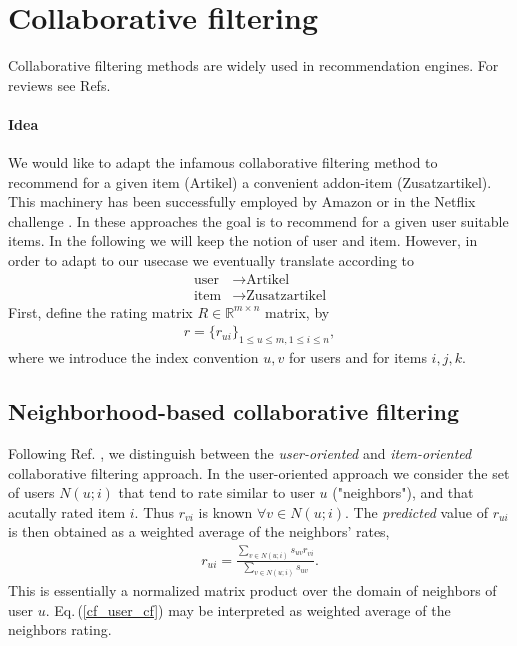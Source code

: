 \documentclass[10pt,a4paper]{article}
\begin{document}
\section{Collaborative filtering}
Collaborative filtering methods are widely used in recommendation engines. For reviews see Refs.\cite{Su:2009:SCF, Adomavicius:2005:TNG, Hofmann:2004:LSM}
\paragraph{Idea} We would like to adapt the infamous collaborative filtering  method to recommend for a given item (Artikel) a convenient addon-item (Zusatzartikel). This machinery has been successfully employed by Amazon or in the Netflix challenge \cite{linden_amazon_2003,bell_yehuda_netflix_2007}. In these approaches the goal is to recommend for a given user suitable items. 
In the following we will keep the notion of user and item. However, in order to adapt to our usecase we eventually translate according to
\begin{align*}
\text{user} &\rightarrow \text{Artikel} \\
\text{item} &\rightarrow \text{Zusatzartikel}
\end{align*}
First, define the rating matrix $R \in \mathbb{R}^{m \times n}$ matrix, by
\begin{align}
r = \{r_{ui}\}_{1\leq u \leq m, 1 \leq i \leq n},
\end{align}
where we introduce the index convention $u, v$ for users and for items $i,j,k$.
\subsection{Neighborhood-based collaborative filtering}
Following Ref. \cite{bell_yehuda_netflix_2007},
we distinguish between the\textit{ user-oriented }and \textit{item-oriented} collaborative filtering approach. In the user-oriented approach we consider 
the set of users $N(u;i)$ that tend to rate similar to user $u$ ("neighbors"),
and that acutally rated item $i$. Thus $r_{vi}$ is known $\forall v \in  N(u;i)$.
The \textit{predicted} value of $r_{ui}$ is then obtained as a weighted average of the neighbors' rates,
\begin{align}
\label{cf_user_cf}
r_{ui} = \frac{\sum_{v \in N(u;i)} s_{uv} r_{vi}}{\sum_{v \in N(u;i)} s_{uv}}.
\end{align} 
This is essentially a normalized matrix product over the domain of neighbors of user $u$. Eq.\,(\ref{cf_user_cf}) may be interpreted as weighted average of the neighbors rating.
\end{document}
